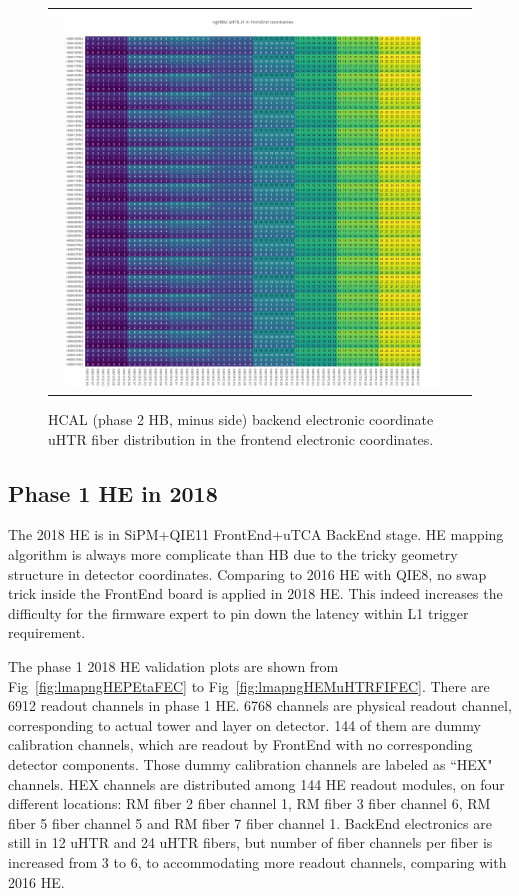 \begin{figure}[htb]
 \begin{center}
  \begin{tabular}{cc}
   \includegraphics[angle=0,width=0.95\textwidth]{figures/appendix/ngHBM_uHTR_FI_in_FrontEnd.png}
  \end{tabular}
  \caption{HCAL (phase 2 HB, minus side) backend electronic coordinate uHTR fiber distribution in the frontend electronic coordinates.}
  \label{fig:lmapngHBMuHTRFIFEC}
 \end{center}
\end{figure}
\clearpage

\subsection{Phase 1 HE in 2018}
The 2018 HE is in SiPM+QIE11 FrontEnd+uTCA BackEnd stage. HE mapping algorithm is always more complicate than HB due to the tricky geometry structure in detector coordinates. Comparing to 2016 HE with QIE8, no swap trick inside the FrontEnd board is applied in 2018 HE. This indeed increases the difficulty for the firmware expert to pin down the latency within L1 trigger requirement. 

The phase 1 2018 HE validation plots are shown from Fig~\ref{fig:lmapngHEPEtaFEC} to Fig~\ref{fig:lmapngHEMuHTRFIFEC}. There are 6912 readout channels in phase 1 HE. 6768 channels are physical readout channel, corresponding to actual tower and layer on detector. 144 of them are dummy calibration channels, which are readout by FrontEnd with no corresponding detector components. Those dummy calibration channels are labeled as ``HEX" channels. HEX channels are distributed among 144 HE readout modules, on four different locations: RM fiber 2 fiber channel 1, RM fiber 3 fiber channel 6, RM fiber 5 fiber channel 5 and RM fiber 7 fiber channel 1. BackEnd electronics are still in 12 uHTR and 24 uHTR fibers, but number of fiber channels per fiber is increased from 3 to 6, to accommodating more readout channels, comparing with 2016 HE.
\clearpage

